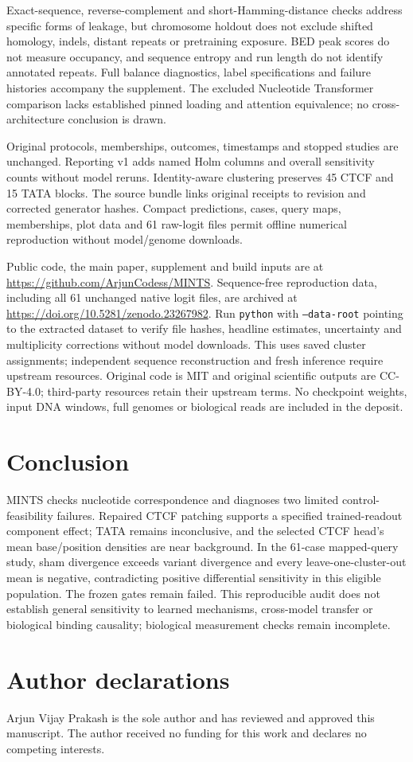 \documentclass[10pt,letterpaper]{article}
\begin{document}
Exact-sequence, reverse-complement and short-Hamming-distance checks address specific forms of leakage, but chromosome holdout does not exclude shifted homology, indels, distant repeats or pretraining exposure. BED peak scores do not measure occupancy, and sequence entropy and run length do not identify annotated repeats. Full balance diagnostics, label specifications and failure histories accompany the supplement. The excluded Nucleotide Transformer comparison lacks established pinned loading and attention equivalence; no cross-architecture conclusion is drawn.

Original protocols, memberships, outcomes, timestamps and stopped studies are unchanged. Reporting v1 adds named Holm columns and overall sensitivity counts without model reruns. Identity-aware clustering preserves 45 CTCF and 15 TATA blocks. The source bundle links original receipts to revision  and corrected generator hashes. Compact predictions, cases, query maps, memberships, plot data and 61 raw-logit files permit offline numerical reproduction without model/genome downloads.

Public code, the main paper, supplement and build inputs are at \url{https://github.com/ArjunCodess/MINTS}. Sequence-free reproduction data, including all 61 unchanged native logit files, are archived at \url{https://doi.org/10.5281/zenodo.23267982}. Run \texttt{python}  with \texttt{--data-root} pointing to the extracted dataset to verify file hashes, headline estimates, uncertainty and multiplicity corrections without model downloads. This uses saved cluster assignments; independent sequence reconstruction and fresh inference require upstream resources. Original code is MIT and original scientific outputs are CC-BY-4.0; third-party resources retain their upstream terms. No checkpoint weights, input DNA windows, full genomes or biological reads are included in the deposit.
\section{Conclusion}
MINTS checks nucleotide correspondence and diagnoses two limited control-feasibility failures. Repaired CTCF patching supports a specified trained-readout component effect; TATA remains inconclusive, and the selected CTCF head's mean base/position densities are near background. In the 61-case mapped-query study, sham divergence exceeds variant divergence and every leave-one-cluster-out mean is negative, contradicting positive differential sensitivity in this eligible population. The frozen gates remain failed. This reproducible audit does not establish general sensitivity to learned mechanisms, cross-model transfer or biological binding causality; biological measurement checks remain incomplete.
\section*{Author declarations}
Arjun Vijay Prakash is the sole author and has reviewed and approved this manuscript. The author received no funding for this work and declares no competing interests.
\clearpage
\end{document}
